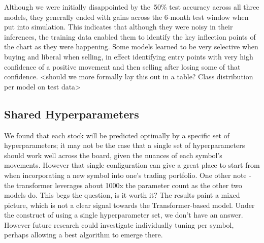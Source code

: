 \documentclass[10pt,twocolumn,letterpaper]{article}
\begin{document}
Although we were initially disappointed by the~50\% test accuracy across all three models, they generally ended with gains across the 6-month test window when put into simulation. This indicates that although they were noisy in their inferences, the training data enabled them to identify the key inflection points of the chart as they were happening. Some models learned to be very selective when buying and liberal when selling, in effect identifying entry points with very high confidence of a positive movement and then selling after losing some of that confidence.  <should we more formally lay this out in a table? Class distribution per model on test data>

\begin{table}
\begin{center}
\end{center}
\caption{Time in seconds of each models' Average Epoch, Training, and Validation performance}
\label{tab:metrics}
\end{table}

\subsection{Shared Hyperparameters}

We found that each stock will be predicted optimally by a specific set of hyperparameters; it may not be the case that a single set of hyperparameters should work well across the board, given the nuances of each symbol’s movements. However that single configuration can give a great place to start from when incorporating a new symbol into one’s trading portfolio.
One other note - the transformer leverages about 1000x the parameter count as the other two models do. This begs the question, is it worth it? The results paint a mixed picture, which is not a clear signal towards the Transformer-based model. Under the construct of using a single hyperparameter set, we don’t have an answer. However future research could investigate individually tuning per symbol, perhaps allowing a best algorithm to emerge there.
\end{document}
